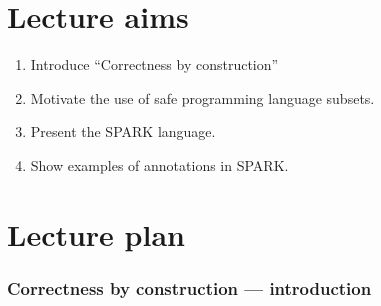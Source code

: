 \documentclass[11pt]{article}
\begin{document}
\section*{Lecture aims}

 \begin{enumerate}

 \item Introduce ``Correctness by construction''

 \item Motivate the use of safe programming language subsets.

 \item Present the SPARK language.

 \item Show examples of annotations in SPARK.

 \end{enumerate}

\section*{Lecture plan}
  
\subsubsection*{Correctness by construction --- introduction}
\end{document}
